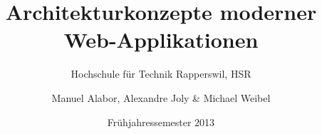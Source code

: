\subject{Bachelorarbeit}
\date{Frühjahressemester 2013}
\title{Architekturkonzepte moderner Web-Applikationen}
\subtitle{Hochschule für Technik Rapperswil, HSR}
\author{Manuel Alabor, Alexandre Joly \& Michael Weibel}

\maketitle